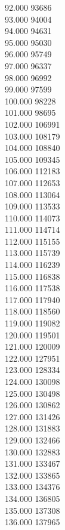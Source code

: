 { 92.000	93686 \\
 93.000	94004 \\
 94.000	94631 \\
 95.000	95030 \\
 96.000	95749 \\
 97.000	96337 \\
 98.000	96992 \\
 99.000	97599 \\
 100.000	98228 \\
 101.000	98695 \\
 102.000	106991 \\
 103.000	108179 \\
 104.000	108840 \\
 105.000	109345 \\
 106.000	112183 \\
 107.000	112653 \\
 108.000	113064 \\
 109.000	113533 \\
 110.000	114073 \\
 111.000	114714 \\
 112.000	115155 \\
 113.000	115739 \\
 114.000	116239 \\
 115.000	116838 \\
 116.000	117538 \\
 117.000	117940 \\
 118.000	118560 \\
 119.000	119082 \\
 120.000	119501 \\
 121.000	120009 \\
 122.000	127951 \\
 123.000	128334 \\
 124.000	130098 \\
 125.000	130498 \\
 126.000	130862 \\
 127.000	131426 \\
 128.000	131883 \\
 129.000	132466 \\
 130.000	132883 \\
 131.000	133467 \\
 132.000	133865 \\
 133.000	134376 \\
 134.000	136805 \\
 135.000	137308 \\
 136.000	137965 \\
}
